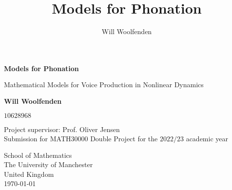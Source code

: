 \documentclass{report}
\title{Models for Phonation}
\author{Will Woolfenden}
\begin{document}
\begin{titlepage}
    \begin{center}
        \vspace*{1cm}
            
        \Huge
        \textbf{Models for Phonation}
            
        \vspace{0.5cm}
        \LARGE
        Mathematical Models for Voice Production in Nonlinear Dynamics
            
        \vspace{1.5cm}
            
        \textbf{Will Woolfenden}
        
        \vspace{0.5cm}
        
        $10628968$
            
        \vfill

        Project supervisor: Prof. Oliver Jensen \\

        \vspace{0.8cm}
        Submission for MATH30000 Double Project for the $2022/23$ academic year
            
        \vspace{0.8cm}
            
        \Large

        School of Mathematics\\
        The University of Manchester\\
        United Kingdom\\
        \today
    \end{center}
\end{titlepage}
\end{document}
